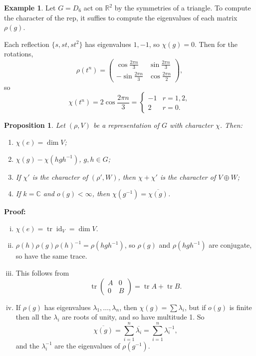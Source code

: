\documentclass[12pt]{article}
\DeclareMathOperator{\tr}{tr}
\DeclareMathOperator{\id}{id}
\newtheorem{proposition}{Proposition}[section]
\theoremstyle{definition}
\newtheorem{example}{Example}[section]
\theoremstyle{remark}
\begin{document}
\begin{adjustbox}{minipage = \columnwidth - 25.5pt, margin=1em, frame=1pt, margin=0em}
\begin{example}
	Let $G = D_6$ act on $\mathbb{R}^2$ by the symmetries of a triangle. To compute the character of the rep, it suffies to compute the eigenvalues of each matrix $\rho(g)$.

	Each reflection $\{s, st, st^2\}$ has eigenvalues $1, -1$, so $\chi(g) = 0$. Then for the rotations,
	\[
		\rho(t^{n}) =
		\begin{pmatrix}
			\cos \frac{2 \pi n}{3} & \sin \frac{2 \pi n}{3} \\
			- \sin \frac{2 \pi n}{3} & \cos \frac{2 \pi n}{2}
		\end{pmatrix}
	,\] 
	so
	\[
		\chi(t^{n}) = 2 \cos \frac{2 \pi n}{3} =
		\begin{cases}
			-1 & r = 1, 2, \\
			2 & r = 0.
		\end{cases}
	\]
\end{example}

\end{adjustbox}

\begin{proposition}
	Let $(\rho, V)$ be a representation of $G$ with character $\chi$. Then:
	\begin{enumerate}[\normalfont(i)]
		\item $\chi(e) = \dim V$;
		\item $\chi(g) - \chi(h g h^{-1})$, $g, h \in G$;
		\item If $\chi'$ is the character of $(\rho', W)$, then $\chi + \chi'$ is the character of $V \oplus W$;
		\item If $k = \mathbb{C}$ and $o(g) < \infty$, then $\chi(g^{-1}) = \overline{\chi(g)}$.
	\end{enumerate}
	
\end{proposition}

\begin{adjustbox}{minipage = \columnwidth - 25.5pt, margin=1em, frame=1pt, margin=0em}
\textbf{Proof:}
\begin{enumerate}[(i)]
\item $\chi(e) = \tr \id_V = \dim V$.
\item $\rho(h)\rho(g)\rho(h)^{-1} = \rho(hgh^{-1})$, so $\rho(g)$ and $\rho(hgh^{-1})$ are conjugate, so have the same trace.
\item This follows from
	\[
	\tr
	\begin{pmatrix}
		A & 0 \\
		0 & B
	\end{pmatrix}
	= \tr A + \tr B
	.\]
\item If $\rho(g)$ has eigenvalues $\lambda_1, \ldots, \lambda_n$, then $\chi(g) = \sum \lambda_i$, but if $o(g)$ is finite then all the $\lambda_i$ are roots of unity, and so have multitude 1. So
	\[
		\overline{\chi(g)} = \sum_{i = 1}^{n} \overline{\lambda_i} = \sum_{i = 1}^{n} \lambda_i^{-1}
	,\]
	and the $\lambda_i^{-1}$ are the eigenvalues of $\rho(g^{-1})$.
\end{enumerate}

\end{adjustbox}
\end{document}
